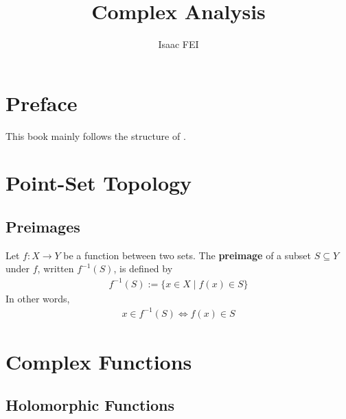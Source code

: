\documentclass[thmcnt=section, color=cyan, 12pt]{my-elegantbook}
\title{Complex Analysis}
\author{Isaac FEI}
\begin{document}
\maketitle


\frontmatter
\chapter*{Preface}

This book mainly follows the structure of \cite{steinComplexAnalysis2003}.


\tableofcontents
\mainmatter



\chapter{Point-Set Topology}


\section{Preimages}

Let $f: X \to Y$ be a function between two sets. The \textbf{preimage} of a subset $S \subseteq Y$ under $f$,
written $f^{-1}(S)$, is defined by
\begin{align*}
    f^{-1}(S) := \{x \in X \mid f(x) \in S\}
\end{align*}
In other words,
\begin{align*}
    x \in f^{-1}(S) \iff f(x) \in S
\end{align*}


\chapter{Complex Functions}


\section{Holomorphic Functions}
\end{document}
